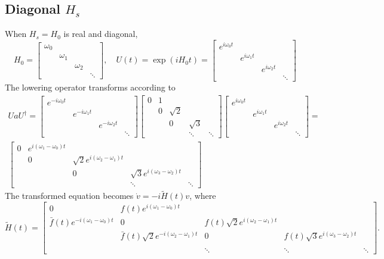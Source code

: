 \documentclass[11pt]{article}
\begin{document}
\subsection{Diagonal $H_s$}
When $H_s=H_0$ is real and diagonal,
\[
H_0=\begin{bmatrix}
\omega_0 & & &\\
& \omega_1 &&\\
& & \omega_2 &\\
& & & \ddots
\end{bmatrix},\quad
%
U(t) = \exp(i H_0 t)=
\begin{bmatrix}
e^{i\omega_0t} & & &\\
& e^{i\omega_1 t} &&\\
& & e^{i\omega_2 t} &\\
& & & \ddots
\end{bmatrix}
\]
The lowering operator transforms according to
\begin{multline*}
UaU^\dag =
\begin{bmatrix}
  e^{-i\omega_0t} & & & \\
  & e^{-i\omega_1 t} & & \\
  & &  e^{-i\omega_2 t} & \\
  & & & \ddots
\end{bmatrix}
\begin{bmatrix}
0 & 1 & & &\\
 & 0 & \sqrt{2} & &\\
&  & 0 & \sqrt{3} &\\
& &  & \ddots & \ddots
\end{bmatrix}
\begin{bmatrix}
  e^{i\omega_0t} & & & \\
  & e^{i\omega_1 t} & & \\
  & &  e^{i\omega_2 t} & \\
  & & & \ddots
\end{bmatrix} = \\
%
\begin{bmatrix}
0 & e^{i(\omega_1 - \omega_0)t} & & &\\
 & 0 & \sqrt{2} e^{i(\omega_2 -\omega_1) t}& &\\
&  & 0 & \sqrt{3} e^{i(\omega_3 -\omega_2)t}  &\\
& &  & \ddots & \ddots
\end{bmatrix}
%
\end{multline*}
The transformed equation becomes $\dot{v} = -i\tilde{H}(t)v$, where
\[
\tilde{H}(t) = \begin{bmatrix}
0 & f(t) e^{i(\omega_1 - \omega_0)t} & & &\\
\bar{f}(t) e^{-i(\omega_1 - \omega_0)t} & 0 & f(t) \sqrt{2} e^{i(\omega_2 -\omega_1) t}& &\\
& \bar{f}(t) \sqrt{2} e^{-i(\omega_2 -\omega_1) t} & 0 & f(t) \sqrt{3} e^{i(\omega_3 -\omega_2)t}
&\\
\\
& & \ddots & \ddots & \ddots
\end{bmatrix}.
\]
\end{document}
